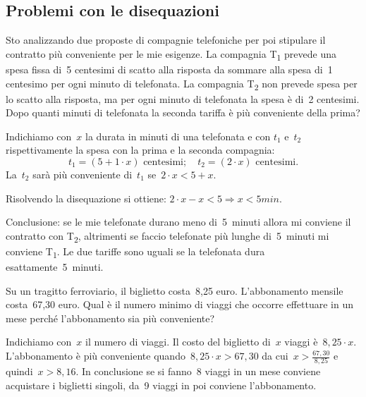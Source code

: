 
\subsection{Problemi con le disequazioni}
\label{sec:dis_problemi}

 \begin{problema}
 Sto analizzando due proposte di compagnie telefoniche per poi stipulare
il contratto più conveniente per le mie esigenze. La compagnia
T\textsubscript{1} prevede una spesa fissa di~5 centesimi di scatto
alla risposta da sommare alla spesa di~1 centesimo per ogni minuto di
telefonata. La compagnia T\textsubscript{2} non prevede spesa per lo
scatto alla risposta, ma per ogni minuto di telefonata la spesa è di~2 
centesimi.
Dopo quanti minuti di telefonata la seconda tariffa è
più conveniente della prima?
 \end{problema}

 \begin{soluzione}
 Indichiamo con~\(x\) la durata in minuti di una telefonata e con
\(t_{1}\) e~\(t_{2}\) rispettivamente la spesa con
la prima e la seconda compagnia:
\[t_{1}=(5+1\cdot x)\text{ centesimi};\quad t_{2}=(2\cdot x)\text{ 
centesimi.}\]
La~\(t_2\) sarà più conveniente di~\(t_1\) se~\(2\cdot x<5+x\).

Risolvendo la disequazione si ottiene:
\(2\cdot x-x<5\Rightarrow x<5\unit{min}\).

Conclusione: se le mie telefonate durano meno di~5~minuti allora mi
conviene il contratto con T\textsubscript{2}, altrimenti se faccio
telefonate più lunghe di~5~minuti mi conviene T\textsubscript{1}. Le
due tariffe sono uguali se la telefonata dura esattamente~5~minuti.
 \end{soluzione}

 \begin{problema}[L'abbonamento]
 Su un tragitto ferroviario, il biglietto costa~8,25 euro.
L'abbonamento mensile costa~67,30 euro. Qual è il
numero minimo di viaggi che occorre effettuare in un mese perché
l'abbonamento sia più conveniente?
 \end{problema}

 \begin{soluzione}
 Indichiamo con~\(x\) il numero di viaggi. Il costo del biglietto di~\(x\) 
viaggi è~\(8,25\cdot x\). L'abbonamento è più
conveniente quando~\(8,25\cdot x>67,30\) da cui~\(x>\frac{67,30}{8,25}\)
e quindi~\(x>8,16\). In conclusione se si fanno~8 viaggi in un
mese conviene acquistare i biglietti singoli, da~9 viaggi in poi
conviene l'abbonamento.
 \end{soluzione}

